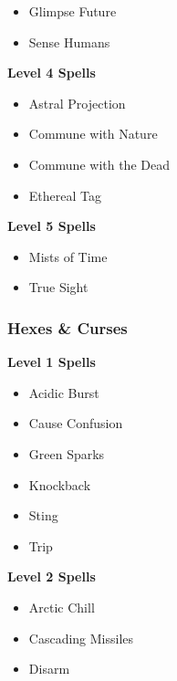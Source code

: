 \begin{multicols}{4}
\begin{itemize}[itemsep=0em]
\item Glimpse Future

\item Sense Humans


\end{itemize}
\textbf{Level 4 Spells}
\begin{itemize}[itemsep=0em]
\renewcommand\labelitemi{-}
\item Astral Projection

\item Commune with Nature

\item Commune with the Dead

\item Ethereal Tag


\end{itemize}
\textbf{Level 5 Spells}
\begin{itemize}[itemsep=0em]
\renewcommand\labelitemi{-}
\item Mists of Time

\item True Sight


\end{itemize}
\vfill\null
\columnbreak\subsubsection{Hexes \& Curses}
\textbf{Level 1 Spells}
\begin{itemize}[itemsep=0em]
\renewcommand\labelitemi{-}
\item Acidic Burst

\item Cause Confusion

\item Green Sparks

\item Knockback

\item Sting

\item Trip


\end{itemize}
\textbf{Level 2 Spells}
\begin{itemize}[itemsep=0em]
\renewcommand\labelitemi{-}
\item Arctic Chill

\item Cascading Missiles

\item Disarm


\end{itemize}
\end{multicols}
